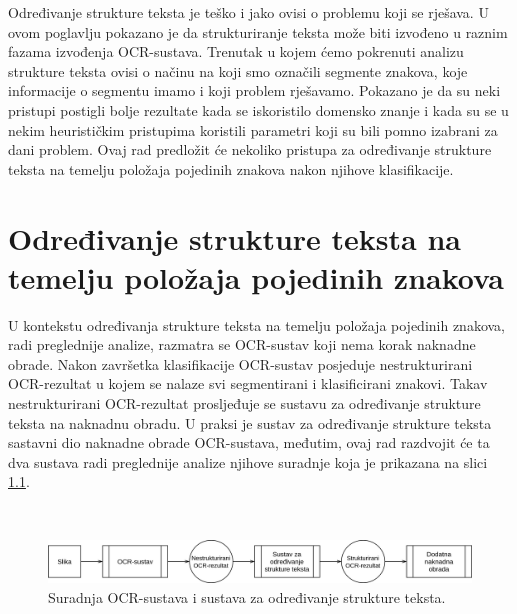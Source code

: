 \documentclass[times, utf8, zavrsni]{fer}
\begin{document}
Određivanje strukture teksta je teško i jako ovisi o problemu koji se
rješava. U ovom poglavlju pokazano je da strukturiranje teksta može biti
izvođeno u raznim fazama izvođenja OCR-sustava. Trenutak u kojem ćemo pokrenuti
analizu strukture teksta ovisi o načinu na koji smo označili segmente znakova,
koje informacije o segmentu imamo i koji problem rješavamo. Pokazano je da su
neki pristupi postigli bolje rezultate kada se iskoristilo domensko znanje i
kada su se u nekim heurističkim pristupima koristili parametri koji su bili
pomno izabrani za dani problem. Ovaj rad predložit će nekoliko pristupa za
određivanje strukture teksta na temelju položaja pojedinih znakova nakon
njihove klasifikacije.
















\chapter{Određivanje strukture teksta na temelju položaja pojedinih znakova}
U kontekstu određivanja strukture teksta na temelju položaja pojedinih znakova,
radi preglednije analize, razmatra se OCR-sustav koji nema
korak naknadne obrade. Nakon završetka klasifikacije OCR-sustav posjeduje
nestrukturirani OCR-rezultat u kojem se nalaze svi segmentirani i
klasificirani znakovi. Takav nestrukturirani OCR-rezultat prosljeđuje se
sustavu za određivanje strukture teksta na naknadnu obradu. U praksi je sustav
za određivanje strukture teksta sastavni dio naknadne obrade OCR-sustava,
međutim, ovaj rad razdvojit će ta dva sustava radi preglednije analize
njihove suradnje koja je prikazana na slici \ref{fig:sustav-01}.

\

\begin{figure}[htb]
    \centering
    \includegraphics[width=\textwidth]{images/sustav-01.png}
    \caption{Suradnja OCR-sustava i sustava za određivanje strukture teksta.}
    \label{fig:sustav-01}
\end{figure}
\end{document}
